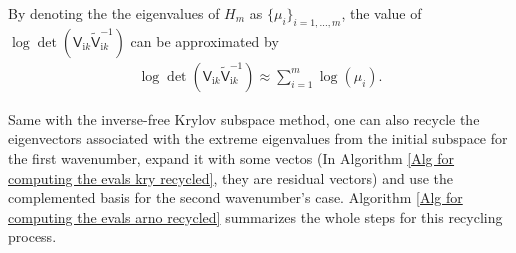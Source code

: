 By denoting the the eigenvalues of $H_{m}$ as $\{\mu_{i}\}_{i = 1, \dots, m}$, the value of  
$\log\det(\mathsf{V}_{\mathrm{i}k}\tilde{\mathsf{V}}_{\mathrm{i}k}^{-1})$ can be approximated by
\begin{align*}
    \log\det(\mathsf{V}_{\mathrm{i}k}\tilde{\mathsf{V}}_{\mathrm{i}k}^{-1}) \approx \sum_{i = 1}^{m}\log\left(\mu_{i}\right).
\end{align*}

Same with the inverse-free Krylov subspace method, one can also recycle the eigenvectors associated with the extreme eigenvalues from the initial subspace 
for the first wavenumber, expand it with some vectos (In Algorithm \ref{Alg for computing the evals kry recycled}, they are residual vectors) and 
use the complemented basis for the second wavenumber's case. Algorithm \ref{Alg for computing the evals arno recycled} summarizes the whole steps for this 
recycling process. 

